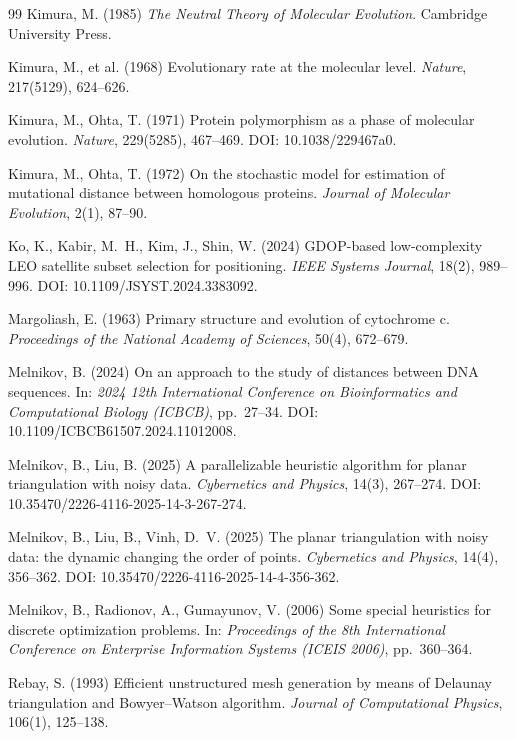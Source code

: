 \documentclass[11pt]{article}
\begin{document}
\begin{thebibliography}{99}
Kimura, M. (1985)
\emph{The Neutral Theory of Molecular Evolution}.
Cambridge University Press.

Kimura, M., et al. (1968)
Evolutionary rate at the molecular level.
\emph{Nature}, 217(5129), 624--626.

Kimura, M., Ohta, T. (1971)
Protein polymorphism as a phase of molecular evolution.
\emph{Nature}, 229(5285), 467--469.
DOI: 10.1038/229467a0.

Kimura, M., Ohta, T. (1972)
On the stochastic model for estimation of mutational distance between
homologous proteins.
\emph{Journal of Molecular Evolution}, 2(1), 87--90.

Ko, K., Kabir, M.~H., Kim, J., Shin, W. (2024)
GDOP-based low-complexity LEO satellite subset selection for
positioning.
\emph{IEEE Systems Journal}, 18(2), 989--996.
DOI: 10.1109/JSYST.2024.3383092.

Margoliash, E. (1963)
Primary structure and evolution of cytochrome c.
\emph{Proceedings of the National Academy of Sciences}, 50(4),
672--679.

Melnikov, B. (2024)
On an approach to the study of distances between DNA sequences.
In: \emph{2024 12th International Conference on Bioinformatics and
Computational Biology (ICBCB)}, pp.~27--34.
DOI: 10.1109/ICBCB61507.2024.11012008.

Melnikov, B., Liu, B. (2025)
A parallelizable heuristic algorithm for planar triangulation with
noisy data.
\emph{Cybernetics and Physics}, 14(3), 267--274.
DOI: 10.35470/2226-4116-2025-14-3-267-274.

Melnikov, B., Liu, B., Vinh, D.~V. (2025)
The planar triangulation with noisy data: the dynamic changing the
order of points.
\emph{Cybernetics and Physics}, 14(4), 356--362.
DOI: 10.35470/2226-4116-2025-14-4-356-362.

Melnikov, B., Radionov, A., Gumayunov, V. (2006)
Some special heuristics for discrete optimization problems.
In: \emph{Proceedings of the 8th International Conference on
Enterprise Information Systems (ICEIS 2006)}, pp.~360--364.

Rebay, S. (1993)
Efficient unstructured mesh generation by means of Delaunay
triangulation and Bowyer--Watson algorithm.
\emph{Journal of Computational Physics}, 106(1), 125--138.


\end{thebibliography}
\end{document}
